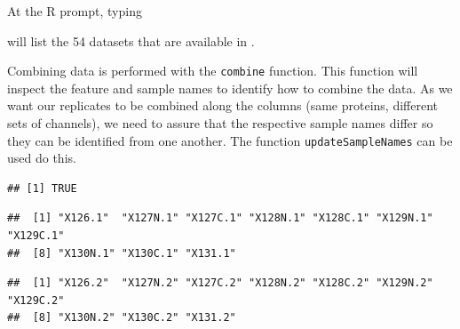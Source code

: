 At the R prompt, typing

\begin{knitrout}
\color{fgcolor}\begin{kframe}
\begin{alltt}
\hlstd{()}
\end{alltt}
\end{kframe}
\end{knitrout}

will list the 54 datasets that are
available in .


Combining data is performed with the \texttt{combine} function. This
function will inspect the feature and sample names to identify how to
combine the data. As we want our replicates to be combined along the
columns (same proteins, different sets of channels), we need to assure
that the respective sample names differ so they can be identified from
one another. The function \texttt{updateSampleNames} can be used do
this.

\begin{knitrout}
\color{fgcolor}\begin{kframe}
\begin{alltt}
\hlstd{(} 
\end{alltt}
\begin{verbatim}
## [1] TRUE
\end{verbatim}
\begin{alltt}
 \hlkwb{<-}  \hlstd{)}
 \hlkwb{<-}  \hlstd{)}
\end{alltt}
\begin{verbatim}
##  [1] "X126.1"  "X127N.1" "X127C.1" "X128N.1" "X128C.1" "X129N.1" "X129C.1"
##  [8] "X130N.1" "X130C.1" "X131.1"
\end{verbatim}
\begin{alltt}
\end{alltt}
\begin{verbatim}
##  [1] "X126.2"  "X127N.2" "X127C.2" "X128N.2" "X128C.2" "X129N.2" "X129C.2"
##  [8] "X130N.2" "X130C.2" "X131.2"
\end{verbatim}
\end{kframe}
\end{knitrout}

